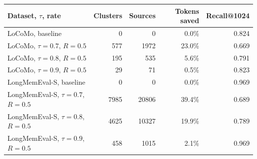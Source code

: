 \begin{tabular}{@{}lrrrr@{}}\toprule
Dataset, $\tau$, rate & Clusters & Sources & Tokens saved & Recall@1024 \\\midrule
LoCoMo, baseline & 0 & 0 & 0.0\% & 0.824 \\
LoCoMo, $\tau=0.7$, $R=0.5$ & 577 & 1972 & 23.0\% & 0.669 \\
LoCoMo, $\tau=0.8$, $R=0.5$ & 195 & 535 & 5.6\% & 0.791 \\
LoCoMo, $\tau=0.9$, $R=0.5$ & 29 & 71 & 0.5\% & 0.823 \\
LongMemEval-S, baseline & 0 & 0 & 0.0\% & 0.969 \\
LongMemEval-S, $\tau=0.7$, $R=0.5$ & 7985 & 20806 & 39.4\% & 0.689 \\
LongMemEval-S, $\tau=0.8$, $R=0.5$ & 4625 & 10327 & 19.9\% & 0.789 \\
LongMemEval-S, $\tau=0.9$, $R=0.5$ & 458 & 1015 & 2.1\% & 0.969 \\
\bottomrule\end{tabular}
